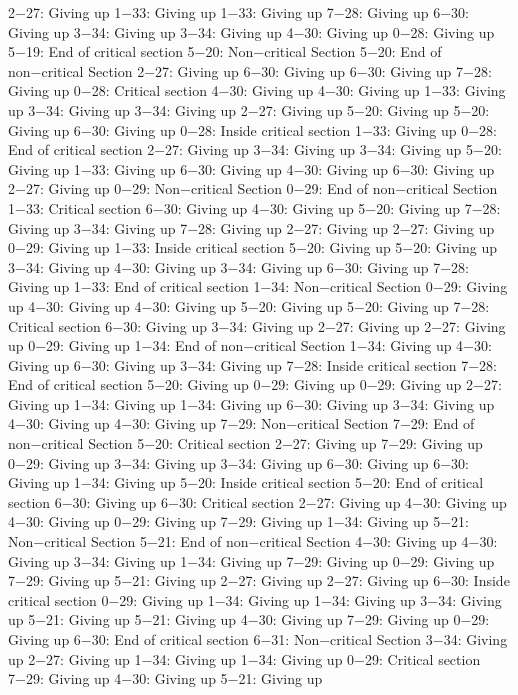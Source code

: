 2−27: Giving up
1−33: Giving up
1−33: Giving up
7−28: Giving up
6−30: Giving up
3−34: Giving up
3−34: Giving up
4−30: Giving up
0−28: Giving up
5−19: End of critical section
5−20: Non−critical Section
5−20: End of non−critical Section
2−27: Giving up
6−30: Giving up
6−30: Giving up
7−28: Giving up
0−28: Critical section
4−30: Giving up
4−30: Giving up
1−33: Giving up
3−34: Giving up
3−34: Giving up
2−27: Giving up
5−20: Giving up
5−20: Giving up
6−30: Giving up
0−28: Inside critical section
1−33: Giving up
0−28: End of critical section
2−27: Giving up
3−34: Giving up
3−34: Giving up
5−20: Giving up
1−33: Giving up
6−30: Giving up
4−30: Giving up
6−30: Giving up
2−27: Giving up
0−29: Non−critical Section
0−29: End of non−critical Section
1−33: Critical section
6−30: Giving up
4−30: Giving up
5−20: Giving up
7−28: Giving up
3−34: Giving up
7−28: Giving up
2−27: Giving up
2−27: Giving up
0−29: Giving up
1−33: Inside critical section
5−20: Giving up
5−20: Giving up
3−34: Giving up
4−30: Giving up
3−34: Giving up
6−30: Giving up
7−28: Giving up
1−33: End of critical section
1−34: Non−critical Section
0−29: Giving up
4−30: Giving up
4−30: Giving up
5−20: Giving up
5−20: Giving up
7−28: Critical section
6−30: Giving up
3−34: Giving up
2−27: Giving up
2−27: Giving up
0−29: Giving up
1−34: End of non−critical Section
1−34: Giving up
4−30: Giving up
6−30: Giving up
3−34: Giving up
7−28: Inside critical section
7−28: End of critical section
5−20: Giving up
0−29: Giving up
0−29: Giving up
2−27: Giving up
1−34: Giving up
1−34: Giving up
6−30: Giving up
3−34: Giving up
4−30: Giving up
4−30: Giving up
7−29: Non−critical Section
7−29: End of non−critical Section
5−20: Critical section
2−27: Giving up
7−29: Giving up
0−29: Giving up
3−34: Giving up
3−34: Giving up
6−30: Giving up
6−30: Giving up
1−34: Giving up
5−20: Inside critical section
5−20: End of critical section
6−30: Giving up
6−30: Critical section
2−27: Giving up
4−30: Giving up
4−30: Giving up
0−29: Giving up
7−29: Giving up
1−34: Giving up
5−21: Non−critical Section
5−21: End of non−critical Section
4−30: Giving up
4−30: Giving up
3−34: Giving up
1−34: Giving up
7−29: Giving up
0−29: Giving up
7−29: Giving up
5−21: Giving up
2−27: Giving up
2−27: Giving up
6−30: Inside critical section
0−29: Giving up
1−34: Giving up
1−34: Giving up
3−34: Giving up
5−21: Giving up
5−21: Giving up
4−30: Giving up
7−29: Giving up
0−29: Giving up
6−30: End of critical section
6−31: Non−critical Section
3−34: Giving up
2−27: Giving up
1−34: Giving up
1−34: Giving up
0−29: Critical section
7−29: Giving up
4−30: Giving up
5−21: Giving up
